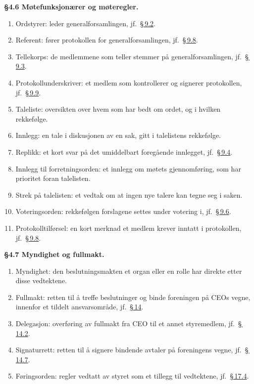 \documentclass{../../../Common/Latex/Templates/rapport}
\begin{document}
\textbf{\S 4.6 Møtefunksjonærer og møteregler.}\label{nbylaw:4.6}
\begin{enumerate}
  \item Ordstyrer: leder generalforsamlingen, jf.\ \hyperref[nbylaw:9.2]{\S\,9.2}.
  \item Referent: fører protokollen for generalforsamlingen, jf.\ \hyperref[nbylaw:9.8]{\S\,9.8}.
  \item Tellekorps: de medlemmene som teller stemmer p\r{a} generalforsamlingen, jf.\ \hyperref[nbylaw:9.3]{\S\,9.3}.
  \item Protokollunderskriver: et medlem som kontrollerer og signerer protokollen, jf.\ \hyperref[nbylaw:9.9]{\S\,9.9}.
  \item Taleliste: oversikten over hvem som har bedt om ordet, og i hvilken rekkefølge.
  \item Innlegg: en tale i diskusjonen av en sak, gitt i talelistens rekkefølge.
  \item Replikk: et kort svar p\r{a} det umiddelbart foreg\r{a}ende innlegget, jf.\ \hyperref[nbylaw:9.4]{\S\,9.4}.
  \item Innlegg til forretningsorden: et innlegg om møtets gjennomføring, som har prioritet foran talelisten.
  \item Strek p\r{a} talelisten: et vedtak om at ingen nye talere kan tegne seg i saken.
  \item Voteringsorden: rekkefølgen forslagene settes under votering i, jf.\ \hyperref[nbylaw:9.6]{\S\,9.6}.
  \item Protokolltilførsel: en kort merknad et medlem krever inntatt i protokollen, jf.\ \hyperref[nbylaw:9.8]{\S\,9.8}.
\end{enumerate}

\textbf{\S 4.7 Myndighet og fullmakt.}\label{nbylaw:4.7}
\begin{enumerate}
  \item Myndighet: den beslutningsmakten et organ eller en rolle har direkte etter disse vedtektene.
  \item Fullmakt: retten til \r{a} treffe beslutninger og binde foreningen p\r{a} CEOs vegne, innenfor et tildelt ansvarsomr\r{a}de, jf.\ \hyperref[nbylaw:14]{\S\,14}.
  \item Delegasjon: overføring av fullmakt fra CEO til et annet styremedlem, jf.\ \hyperref[nbylaw:14.2]{\S\,14.2}.
  \item Signaturrett: retten til \r{a} signere bindende avtaler p\r{a} foreningens vegne, jf.\ \hyperref[nbylaw:14.7]{\S\,14.7}.
  \item Føringsorden: regler vedtatt av styret som et tillegg til vedtektene, jf.\ \hyperref[nbylaw:17.4]{\S\,17.4}.
\end{enumerate}
\end{document}

